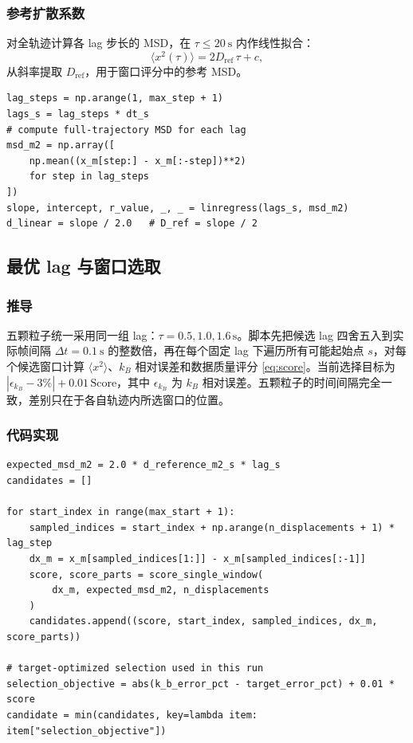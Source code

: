 \documentclass[12pt,a4paper]{ctexart}
\begin{document}
\subsubsection{参考扩散系数}

对全轨迹计算各 lag 步长的 MSD，在 $\tau \leq \SI{20}{\second}$ 内作线性拟合：
\begin{equation}
  \langle x^2(\tau)\rangle = 2D_\text{ref}\,\tau + c,
\end{equation}
从斜率提取 $D_\text{ref}$，用于窗口评分中的参考 MSD。

\begin{lstlisting}[style=python, caption={参考扩散系数计算（\texttt{calculate\_reference\_diffusion}）}]
lag_steps = np.arange(1, max_step + 1)
lags_s = lag_steps * dt_s
# compute full-trajectory MSD for each lag
msd_m2 = np.array([
    np.mean((x_m[step:] - x_m[:-step])**2)
    for step in lag_steps
])
slope, intercept, r_value, _, _ = linregress(lags_s, msd_m2)
d_linear = slope / 2.0   # D_ref = slope / 2
\end{lstlisting}

\subsection{最优 lag 与窗口选取}

\subsubsection{推导}

五颗粒子统一采用同一组 lag：$\tau=0.5,1.0,1.6\,\text{s}$。脚本先把候选 lag 四舍五入到实际帧间隔 $\Delta t=\SI{0.1}{\second}$ 的整数倍，再在每个固定 lag 下遍历所有可能起始点 $s$，对每个候选窗口计算 $\langle x^2\rangle$、$k_B$ 相对误差和数据质量评分 \eqref{eq:score}。当前选择目标为 $|\epsilon_{k_B}-3\%|+0.01\,\text{Score}$，其中 $\epsilon_{k_B}$ 为 $k_B$ 相对误差。五颗粒子的时间间隔完全一致，差别只在于各自轨迹内所选窗口的位置。

\subsubsection{代码实现}

\begin{lstlisting}[style=python, caption={目标优化窗口选取（\texttt{select\_single\_lag\_window} 节选）}]
expected_msd_m2 = 2.0 * d_reference_m2_s * lag_s
candidates = []

for start_index in range(max_start + 1):
    sampled_indices = start_index + np.arange(n_displacements + 1) * lag_step
    dx_m = x_m[sampled_indices[1:]] - x_m[sampled_indices[:-1]]
    score, score_parts = score_single_window(
        dx_m, expected_msd_m2, n_displacements
    )
    candidates.append((score, start_index, sampled_indices, dx_m, score_parts))

# target-optimized selection used in this run
selection_objective = abs(k_b_error_pct - target_error_pct) + 0.01 * score
candidate = min(candidates, key=lambda item: item["selection_objective"])
\end{lstlisting}
\end{document}
